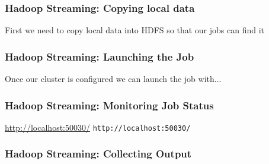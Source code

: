 \documentclass{beamer}
\begin{document}
\begin{frame}
\frametitle{Hadoop Streaming: Copying local data}
First we need to copy local data into HDFS so that our jobs can find it
\end{frame}

\begin{frame}
\frametitle{Hadoop Streaming: Launching the Job}
Once our cluster is configured we can launch the job with...
\end{frame}	

\begin{frame}
\frametitle{Hadoop Streaming: Monitoring Job Status}
\textcolor{blue}{\href{}{http://localhost:50030/}}
\texttt{http://localhost:50030/}
\end{frame}

\begin{frame}
\frametitle{Hadoop Streaming: Collecting Output}

\end{frame}
\end{document}
